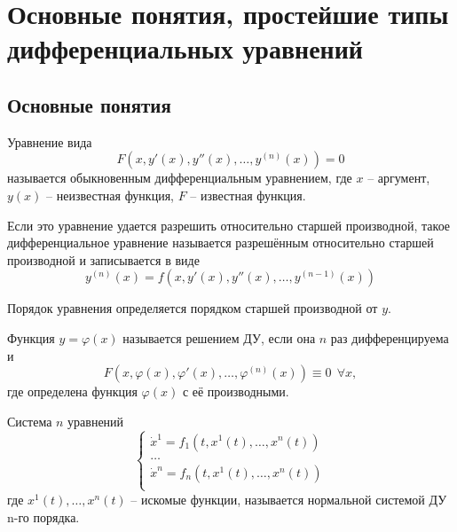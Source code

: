




    \section{Основные понятия, простейшие типы дифференциальных уравнений}
    \subsection{Основные понятия}

    \begin{definition} 
        Уравнение вида \[F(x, y'(x), y''(x), \dots, y^{(n)}(x)) = 0\] называется обыкновенным дифференциальным уравнением,
        где $x$ -- аргумент, $y(x)$ -- неизвестная функция, $F$ -- известная функция.
    \end{definition}

    \begin{definition}
        Если это уравнение удается разрешить относительно старшей производной, такое дифференциальное
        уравнение называется разрешённым относительно старшей производной и записывается в виде
        \[y^{(n)}(x) = f(x, y'(x), y''(x), \dots, y^{(n-1)}(x))\]
    \end{definition}

    Порядок уравнения определяется порядком старшей производной от $y$.

    \begin{definition}
        Функция $y = \varphi(x)$ называется решением ДУ, если она $n$ раз дифференцируема и 
        \[F(x, \varphi(x), \varphi'(x), \dots, \varphi^{(n)}(x)) \equiv 0 ~~ \forall x,\]
        где определена функция $\varphi(x)$ с её производными.
    \end{definition}

    \begin{definition}
        Система $n$ уравнений
        \begin{equation*}
            \begin{cases}
                \dot x^1 = f_1(t, x^1(t), \dots, x^n(t)) \\
                \dots \\
                \dot x^n = f_n(t, x^1(t), \dots, x^n(t)) \\
            \end{cases}
        \end{equation*}
        где $x^1(t), \dots, x^n(t)$ -- искомые функции, называется нормальной системой ДУ n-го порядка.
    \end{definition}


